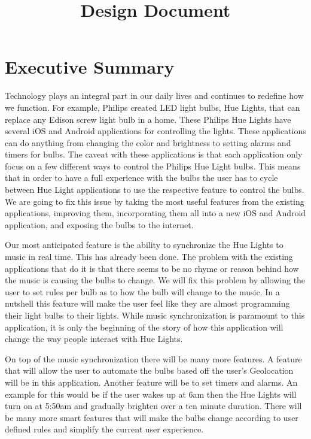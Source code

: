 \documentclass[12pt]{article}
\begin{document}
\title{Design Document}
\setlength{\voffset}{0cm}
\setlength{\hoffset}{0cm}

\setlength{\voffset}{-2.54cm}
\setlength{\hoffset}{-2.54cm}
\tableofcontents
\clearpage
{}


\renewcommand{\thefigure}{\arabic{section}.\arabic{figure}}

\section{Executive Summary}
Technology plays an integral part in our daily lives and continues to redefine how we function.  For example, Philips created LED light bulbs, Hue Lights, that can replace any Edison screw light bulb in a home.  These Philips Hue Lights have several iOS and Android applications for controlling the lights. These applications can do anything from changing the color and brightness to setting alarms and timers for bulbs. The caveat with these applications is that each application only focus on a few different ways to control the Philips Hue Light bulbs.  This means that in order to have a full experience with the bulbs the user has to cycle between Hue Light applications to use the respective feature to control the bulbs. We are going to fix this issue by taking the most useful features from the existing applications, improving them, incorporating them all into a new iOS and Android application, and exposing the bulbs to the internet. 
 
Our most anticipated feature is the ability to synchronize the Hue Lights to music in real time.  This has already been done. The problem with the existing applications that do it is that there seems to be no rhyme or reason behind how the music is causing the bulbs to change.  We will fix this problem by allowing the user to set rules per bulb as to how the bulb will change to the music.  In a nutshell this feature will make the user feel like they are almost programming their light bulbs to their lights. While music synchronization is paramount to this application, it is only the beginning of the story of how this application will change the way people interact with Hue Lights.

On top of the music synchronization there will be many more features.  A feature that will allow the user to automate the bulbs based off the user's Geolocation will be in this application.  Another feature will be to set timers and alarms.  An example for this would be if the user wakes up at 6am then the Hue Lights will turn on at 5:50am and gradually brighten over a ten minute duration.  There will be many more smart features that will make the bulbs change according to user defined rules and simplify the current user experience. 
\end{document}
